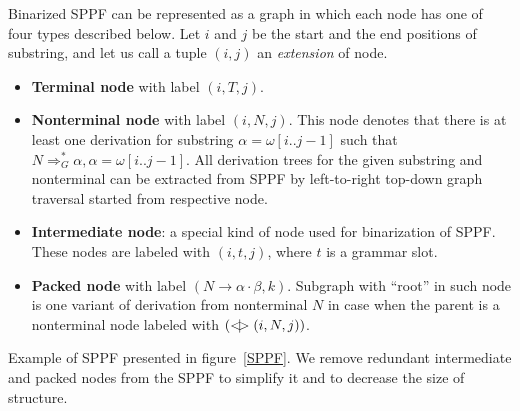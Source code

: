 Binarized SPPF can be represented as a graph in which each node has one of four types described below.
Let $i$ and $j$ be the start and the end positions of substring, and let us call a tuple $(i,j)$ an \textit{extension} of node.

\begin{itemize}
    \item \textbf{Terminal node} with label $(i, T, j)$.
    \item \textbf{Nonterminal node} with label $(i, N, j)$. 
    This node denotes that there is at least one derivation for substring $\alpha=\omega[i..j-1]$ such that $N \Rightarrow^*_G \alpha, \alpha = \omega[i..j-1] $.
    All derivation trees for the given substring and nonterminal can be extracted from SPPF by left-to-right top-down graph traversal started from respective node.     
    \item \textbf{Intermediate node}: a special kind of node used for binarization of SPPF. These nodes are labeled with $(i,t,j)$, where $t$ is a grammar slot.
    \item \textbf{Packed node} with label $(N \rightarrow \alpha \cdot \beta, k)$. 
    Subgraph with ``root'' in such node is one variant of derivation from nonterminal $N$ in case when the parent is a nonterminal node labeled with $(<\mkern-9mu | \mkern-9mu> (i, N, j))$.

\end{itemize}

Example of SPPF presented in figure~\ref{SPPF}. We remove redundant intermediate and packed nodes from the SPPF to simplify it and to decrease the size of structure.
